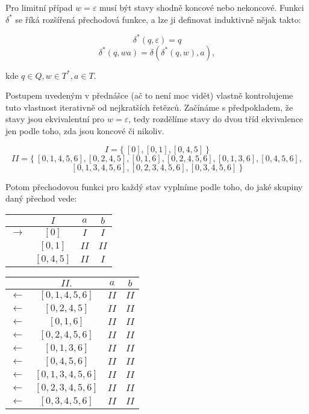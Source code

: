 \documentclass{article}
\begin{document}
Pro limitní případ $w = \varepsilon$ musí být stavy shodně koncové nebo nekoncové.
Funkci $\delta^*$ se říká rozšířená přechodová funkce, a lze ji definovat induktivně nějak takto:

$$
\delta^*(q, \varepsilon) = q
$$
$$
\delta^*(q, wa)  = \delta( \delta^*(q, w), a),
$$

\noindent
kde  $q \in Q, w \in T^*, a \in T$.


Postupem uvedeným v přednášce (ač to není moc vidět) vlastně kontrolujeme tuto vlastnost iterativně od nejkratších řetězců.
Začínáme s předpokladem, že stavy jsou ekvivalentní pro $w = \varepsilon$, tedy rozdělíme stavy do dvou tříd ekvivalence jen podle toho, zda jsou koncové či nikoliv.

$$I = \{~[0], [0,1], [0,4,5]~\}$$
$$
II = \{~[0,1,4,5,6], [0,2,4,5], [0,1,6], [0,2,4,5,6], [0,1,3,6], [0,4,5,6], $$$$[0,1,3,4,5,6], [0,2,3,4,5,6], [0,3,4,5,6]~\}$$

Potom přechodovou funkci pro každý stav vyplníme podle toho, do jaké skupiny daný přechod vede:

\begin{tabular}{|rc||c|c|}
\hline
 &$I$ &      $a$ &   $b$       \\
\hline
\hline
$\rightarrow$ & $[0]$     &   $I$ & $I$\\
              & $[0,1]$   &  $II$ & $II$\\
              & $[0,4,5]$ &  $II$ & $I$\\
\hline
\end{tabular}

\begin{tabular}{|rc||c|c|}
\hline
 & $II.$ &      $a$ &   $b$\\
\hline
\hline
$\leftarrow$ &$[0,1,4,5,6]$ &    $II$ &   $II$\\
$\leftarrow$ &$[0,2,4,5]$ &      $II$ &   $II$\\
$\leftarrow$ &$[0,1,6]$ &        $II$ &   $II$\\
$\leftarrow$ &$[0,2,4,5,6]$ &    $II$ &   $II$\\
$\leftarrow$ &$[0,1,3,6]$ &      $II$ &   $II$\\
$\leftarrow$ &$[0,4,5,6]$ &      $II$ &   $II$\\
$\leftarrow$ &$[0,1,3,4,5,6]$ &  $II$ &   $II$\\
$\leftarrow$ &$[0,2,3,4,5,6]$ &  $II$ &   $II$\\
$\leftarrow$ &$[0,3,4,5,6]$ &    $II$ &   $II$\\
\hline
\end{tabular}
\end{document}
